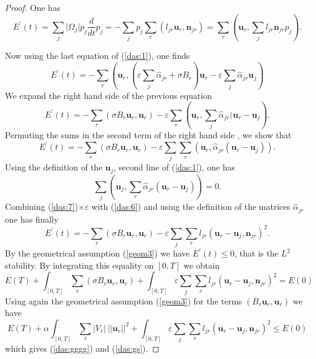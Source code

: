 \documentclass[a4paper,french,english,10pt]{article}
\newcommand\ljr{l_{jr}}
\newcommand\njr{\mathbf{n}_{jr}}
\newcommand\uu{\mathbf{u}}
\newcommand\eps{\varepsilon}
\newcommand\alj{\widehat{\alpha}_{jr}}
\newcommand\uj{\uu_j}
\newcommand\ur{\uu_r}
\begin{document}
\begin{proof}
One has
$$
E^{'}(t)= \sum_j \vert \Omega_j\vert p_j \frac{d}{dt}p_j
= -\sum_j  p_j \sum_{r}(l_{jr}\ur,\njr) 
 =\sum_r \left (\uu_r, \sum_{j}l_{jr}\njr p_j\right ) .
$$

 Now using the last equation of (\ref{das:1}),  one finds
\begin{equation*}\label{das:4}
E^{'}(t)= -\sum_r \left (\uu_r, \left( \eps\sum_{j}\alj+ 
\sigma B_r\right)\ur-
\eps\sum_j\alj\uj\right )
\end{equation*}
We expand the right hand side  of the previous equation 
\begin{equation*}\label{das:5}
E^{'}(t)= -\sum_r \left (\sigma B_r \uu_r, \uu_r\right ) 
-\eps \sum_r\left( \uu_r, \sum_j \alj(\uu_r -\uu_j\right ).
\end{equation*}
Permuting the sums in the second term of the right hand side , we show that
\begin{equation}\label{das:6}
E^{'}(t)= -\sum_r \left (\sigma B_r \uu_r, \uu_r\right ) 
-\eps\sum_j\sum_r \left( \uu_r,  \alj(\uu_r -\uu_j)\right ).
\end{equation}
Using the definition of the $\uu_j$, second line of (\ref{das:1}), one has
\begin{equation}\label{das:7}
\sum_j 
\left( \uu_j,  \sum_r \alj(\uu_r -\uu_j)\right)=0. 
\end{equation}
Combining (\ref{das:7})$\times \eps$  with (\ref{das:6}) and using the definition of
the matrices $\alj$ one has finally
\begin{equation*}\label{das:8}
E^{'}(t)= -\sum_r \left (\sigma B_r \uu_r, \uu_r\right ) 
-\eps\sum_j\sum_r \ljr \left( \uu_r- \uu_j,  \njr\right )^2.
\end{equation*}
By the geometrical assumption  (\ref{geom3}) we have $E^{'}(t)\leq 0$, that is
the $L^2$ stability.
By integrating this equality on $[0,T]$ we obtain
\begin{equation*}\label{eq:ds5bis}
\displaystyle
E(T) + \int_{[0,T]}\sum_r \left (\sigma B_r \uu_r, \uu_r\right ) 
 +\int_{[0,T]}\eps\sum_j\sum_r \ljr \left( \uu_r- \uu_j,  \njr\right )^2=E(0)
\end{equation*}
Using again the geometrical assumption  (\ref{geom3}) for the terms
$(B_r\ur,\ur)$ we have
\begin{equation*}\label{eq:ds6bis}
E(T) + \alpha \int_{[0,T]}\sum_r  \vert V_r\vert \  \vert\vert\uu_r\vert\vert^2 
+ \int_{[0,T]}\eps\sum_j\sum_r \ljr \left( \uu_r- \uu_j,  \njr\right )^2\leq
E(0)
\end{equation*}
which gives (\ref{das:gggg}) and (\ref{das:gs}).
\end{proof}
\end{document}
